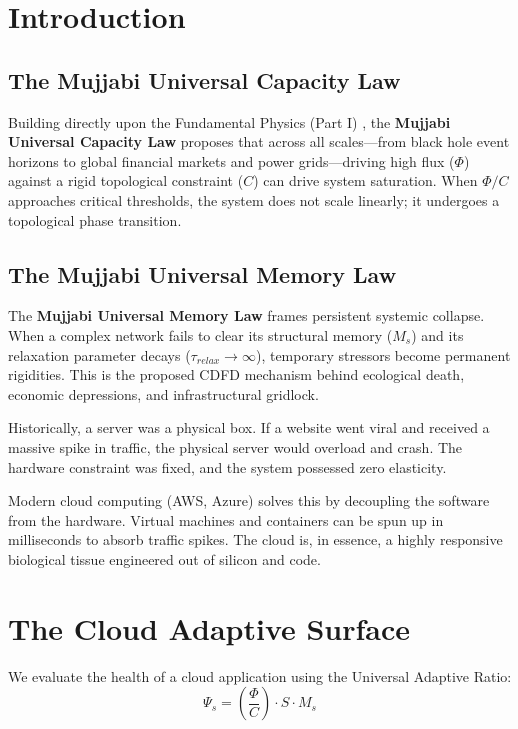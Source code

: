 \documentclass[11pt,a4paper]{article}
\begin{document}
\section{Introduction}

\subsection{The Mujjabi Universal Capacity Law}
Building directly upon the Fundamental Physics (Part I) \cite{MujjabiPartI2026}, the \textbf{Mujjabi Universal Capacity Law} proposes that across all scales---from black hole event horizons to global financial markets and power grids---driving high flux ($\Phi$) against a rigid topological constraint ($C$) can drive system saturation. When $\Phi/C$ approaches critical thresholds, the system does not scale linearly; it undergoes a topological phase transition.

\subsection{The Mujjabi Universal Memory Law}
The \textbf{Mujjabi Universal Memory Law} frames persistent systemic collapse. When a complex network fails to clear its structural memory ($M_s$) and its relaxation parameter decays ($\tau_{relax} \to \infty$), temporary stressors become permanent rigidities. This is the proposed CDFD mechanism behind ecological death, economic depressions, and infrastructural gridlock.

Historically, a server was a physical box. If a website went viral and received a massive spike in traffic, the physical server would overload and crash. The hardware constraint was fixed, and the system possessed zero elasticity.

Modern cloud computing (AWS, Azure) solves this by decoupling the software from the hardware. Virtual machines and containers can be spun up in milliseconds to absorb traffic spikes. The cloud is, in essence, a highly responsive biological tissue engineered out of silicon and code.

\section{The Cloud Adaptive Surface}
We evaluate the health of a cloud application using the Universal Adaptive Ratio:
\begin{equation}
    \Psi_s = \left( \frac{\Phi}{C} \right) \cdot S \cdot M_s
\end{equation}
\end{document}
